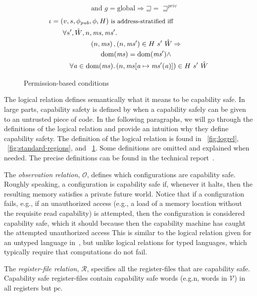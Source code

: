 \documentclass[compsoc,conference,letterpaper,fleqn]{IEEEtran}
\newcommand{\update}[2]{[#1 \mapsto #2]}
\DeclareMathOperator{\dom}{dom}
\newcommand{\var}[1]{\mathit{#1}}
\newcommand{\hs}{\var{ms}}
\newcommand{\ms}{\hs}
\newcommand{\gl}{\var{g}}
\newcommand{\pcreg}{\mathrm{pc}}
\newcommand{\addr}{\var{a}}
\newcommand{\future}{\mathbin{\sqsupseteq}}
\newcommand{\pub}{\var{pub}}
\newcommand{\futurestr}{\mathbin{\sqsupseteq}^{\var{priv}}}
\newcommand{\asmType}{\plaindom{AsmType}}
\newcommand{\plaindom}[1]{\mathrm{#1}}
\newcommand{\intr}[2]{\mathcal{#1}}
\newcommand{\valueintr}[1]{\intr{V}{#1}}
\newcommand{\regintr}[1]{\intr{R}{#1}}
\newcommand{\stdvr}{\valueintr{\asmType}}
\newcommand{\stdrr}{\regintr{\asmType}}
\newcommand{\observations}{\mathcal{O}}
\newcommand{\npair}[2][n]{\left(#1,#2 \right)}
\newcommand{\plainperm}[1]{\mathrm{#1}}
\newcommand{\glob}{\plainperm{global}}
\begin{document}
{\begin{figure}[htbp]
\begin{align*}
  & \quad \text{and } \gl = \glob \Rightarrow \future = \futurestr
\end{align*}
  \begin{align*}
    &\iota = (v,s,\phi_\pub,\phi,H) \text{\footnotesize{ is address-stratified iff}}\\
    &\qquad\begin{multlined}
      \forall s', \hat{W}, n, \ms, \ms' \ldotp \\
      \npair{\ms},\npair{\ms'} \in H~ s'~ \hat{W} \Rightarrow \\
      \dom(\ms) = \dom(\ms') \wedge \\
      \forall \addr \in
      \dom(\ms)\ldotp \npair{\ms\update{\addr}{\ms'(\addr)}} \in H~ s'~ \hat{W}
    \end{multlined}
  \end{align*}

\caption{Permission-based conditions}
\label{fig:perm-conds}
\end{figure}
\clearpage
}
The logical relation defines semantically what it means to be
capability safe. In large parts, capability safety is defined by
when a capability safely can be given to an untrusted piece of
code. In the following paragraphs, we will go through the definitions
of the logical relation and provide an intuition why they define
capability safety.
The definition of the logical relation is found in
\figurename~\ref{fig:logrel}, \figurename~\ref{fig:standard-regions},
and \figurename~\ref{fig:perm-conds}. Some definitions are omitted and
explained when needed. The precise definitions can be found in the
technical report~\cite{XXX}.

The \emph{observation relation}, $\observations$, defines which
configurations are capability safe. Roughly speaking,
a configuration is capability safe if, whenever it halts, then
the resulting memory satisfies a private future world. 
Notice that if a configuration fails, e.g., if an unauthorized access 
(e.g., a load of a memory location without the requisite read capability)
is attempted, then the configuration is considered capability safe, which it should
because then the capability machine has caught the attempted unauthorized access
This is similar to the logical relation given for an untyped language
in~\cite{Devriese:2016ObjCap}, but unlike logical relations for typed languages, which
typically require that computations do not fail. 

The \emph{register-file relation}, $\stdrr$, specifies all the
register-files that are capability safe. Capability safe
register-files contain capability safe words (e.g.n, words in
$\stdvr$) in all registers but $\pcreg$.
\end{document}
